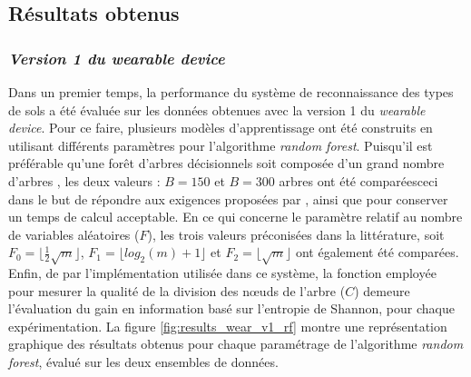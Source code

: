 \subsection{Résultats obtenus}

\subsubsection{\textit{Version 1 du wearable device}}

Dans un premier temps, la performance du système de reconnaissance des types de sols a été évaluée sur les données obtenues avec la version 1 du \textit{wearable device}. Pour ce faire, plusieurs modèles d'apprentissage ont été construits en utilisant différents paramètres pour l'algorithme \textit{random forest}. Puisqu'il est préférable qu'une forêt d'arbres décisionnels soit composée d'un grand nombre d'arbres \citep{Breiman2001}, les deux valeurs : $B=150$ et $B=300$ arbres ont été comparées\textemdash ceci dans le but de répondre aux exigences proposées par \cite{Breiman2001}, ainsi que pour conserver un temps de calcul acceptable. En ce qui concerne le paramètre relatif au nombre de variables aléatoires ($F$), les trois valeurs préconisées dans la littérature, soit $F_0=\lfloor \frac{1}{2}\sqrt{m}\rfloor$, $F_1=\lfloor log_2(m) + 1\rfloor$ et $F_2=\lfloor \sqrt{m}\rfloor$ ont également été comparées. Enfin, de par l'implémentation utilisée dans ce système, la fonction employée pour mesurer la qualité de la division des n\oe{}uds de l'arbre ($C$) demeure l'évaluation du gain en information basé sur l'entropie de Shannon, pour chaque expérimentation. La figure \ref{fig:results_wear_v1_rf} montre une représentation graphique des résultats obtenus pour chaque paramétrage de l'algorithme \textit{random forest}, évalué sur les deux ensembles de données.

